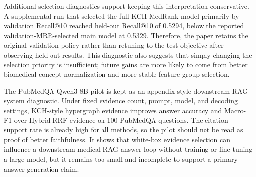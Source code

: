 Additional selection diagnostics support keeping this interpretation conservative. A supplemental run that selected the full KCH-MedRank model primarily by validation Recall@10 reached held-out Recall@10 of 0.5294, below the reported validation-MRR-selected main model at 0.5329. Therefore, the paper retains the original validation policy rather than retuning to the test objective after observing held-out results. This diagnostic also suggests that simply changing the selection priority is insufficient; future gains are more likely to come from better biomedical concept normalization and more stable feature-group selection.

The PubMedQA Qwen3-8B pilot is kept as an appendix-style downstream RAG-system diagnostic. Under fixed evidence count, prompt, model, and decoding settings, KCH-style hypergraph evidence improves answer accuracy and Macro-F1 over Hybrid RRF evidence on 100 PubMedQA questions. The citation-support rate is already high for all methods, so the pilot should not be read as proof of better faithfulness. It shows that white-box evidence selection can influence a downstream medical RAG answer loop without training or fine-tuning a large model, but it remains too small and incomplete to support a primary answer-generation claim.

